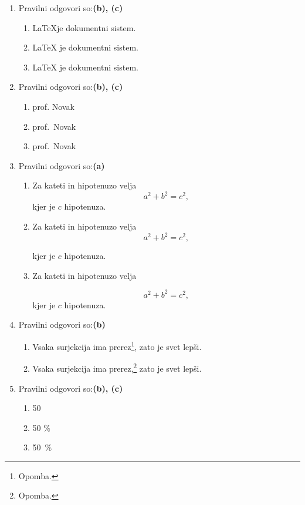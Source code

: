\documentclass[11pt]{article}
\begin{document}
\begin{enumerate}
    \item Pravilni odgovori so:\textbf{(b), (c)}%
    \begin{enumerate}
        \item \LaTeX je dokumentni sistem.
        \item {\LaTeX} je dokumentni sistem.
        \item \LaTeX{} je dokumentni sistem.
    \end{enumerate}

    \item Pravilni odgovori so:\textbf{(b), (c)}%
    \begin{enumerate}
        \item prof. Novak
        \item prof.~Novak
        \item prof.\ Novak
    \end{enumerate}

    \item Pravilni odgovori so:\textbf{(a)}%
    \begin{enumerate}
        \item
Za kateti in hipotenuzo velja
\[
  a^2 + b^2 = c^2,
\]
kjer je \(c\) hipotenuza.
        \item
Za kateti in hipotenuzo velja
\[
  a^2 + b^2 = c^2,
\]

kjer je \(c\) hipotenuza.
        \item
Za kateti in hipotenuzo velja

\[
  a^2 + b^2 = c^2,
\]
kjer je \(c\) hipotenuza.
    \end{enumerate}

    \item Pravilni odgovori so:\textbf{(b)}%
    \begin{enumerate}
        \item Vsaka surjekcija ima prerez\footnote{Opomba.}, zato je svet lepši.
        \item Vsaka surjekcija ima prerez,\footnote{Opomba.} zato je svet lepši.
    \end{enumerate}

    \item Pravilni odgovori so:\textbf{(b), (c)}%
    \begin{enumerate}
        \item 50 %
        \item 50 \%
        \item 50~\%
    \end{enumerate}


\end{enumerate}
\end{document}
